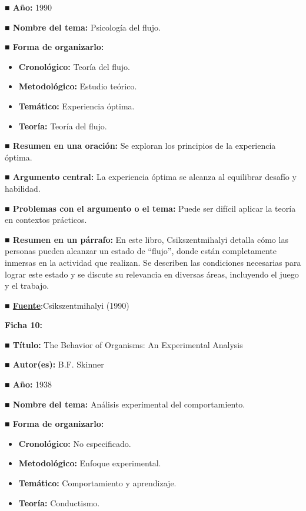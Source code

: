 \documentclass[
  letterpaper,
  DIV=11,
  numbers=noendperiod]{scrreprt}
\begin{document}
\textbf{■ Año:} 1990

\textbf{■ Nombre del tema:} Psicología del flujo.

\textbf{■ Forma de organizarlo:}

\begin{itemize}
\item
  \textbf{Cronológico:} Teoría del flujo.
\item
  \textbf{Metodológico:} Estudio teórico.
\item
  \textbf{Temático:} Experiencia óptima.
\item
  \textbf{Teoría:} Teoría del flujo.
\end{itemize}

\textbf{■ Resumen en una oración:} Se exploran los principios de la
experiencia óptima.

\textbf{■ Argumento central:} La experiencia óptima se alcanza al
equilibrar desafío y habilidad.

\textbf{■ Problemas con el argumento o el tema:} Puede ser difícil
aplicar la teoría en contextos prácticos.

\textbf{■ Resumen en un párrafo:} En este libro, Csikszentmihalyi
detalla cómo las personas pueden alcanzar un estado de ``flujo'', donde
están completamente inmersas en la actividad que realizan. Se describen
las condiciones necesarias para lograr este estado y se discute su
relevancia en diversas áreas, incluyendo el juego y el trabajo.

\textbf{■
\href{https://en.wikipedia.org/wiki/Flow_(psychology)}{Fuente}}:Csikszentmihalyi
(1990)

\textbf{Ficha 10:}

\textbf{■ Título:} The Behavior of Organisms: An Experimental Analysis

\textbf{■ Autor(es):} B.F. Skinner

\textbf{■ Año:} 1938

\textbf{■ Nombre del tema:} Análisis experimental del comportamiento.

\textbf{■ Forma de organizarlo:}

\begin{itemize}
\item
  \textbf{Cronológico:} No especificado.
\item
  \textbf{Metodológico:} Enfoque experimental.
\item
  \textbf{Temático:} Comportamiento y aprendizaje.
\item
  \textbf{Teoría:} Conductismo.
\end{itemize}
\end{document}
